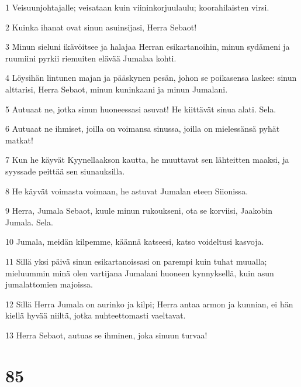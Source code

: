 \par 1 Veisuunjohtajalle; veisataan kuin viininkorjuulaulu; koorahilaisten virsi.
\par 2 Kuinka ihanat ovat sinun asuinsijasi, Herra Sebaot!
\par 3 Minun sieluni ikävöitsee ja halajaa Herran esikartanoihin, minun sydämeni ja ruumiini pyrkii riemuiten elävää Jumalaa kohti.
\par 4 Löysihän lintunen majan ja pääskynen pesän, johon se poikasensa laskee: sinun alttarisi, Herra Sebaot, minun kuninkaani ja minun Jumalani.
\par 5 Autuaat ne, jotka sinun huoneessasi asuvat! He kiittävät sinua alati. Sela.
\par 6 Autuaat ne ihmiset, joilla on voimansa sinussa, joilla on mielessänsä pyhät matkat!
\par 7 Kun he käyvät Kyynellaakson kautta, he muuttavat sen lähteitten maaksi, ja syyssade peittää sen siunauksilla.
\par 8 He käyvät voimasta voimaan, he astuvat Jumalan eteen Siionissa.
\par 9 Herra, Jumala Sebaot, kuule minun rukoukseni, ota se korviisi, Jaakobin Jumala. Sela.
\par 10 Jumala, meidän kilpemme, käännä katseesi, katso voideltusi kasvoja.
\par 11 Sillä yksi päivä sinun esikartanoissasi on parempi kuin tuhat muualla; mieluummin minä olen vartijana Jumalani huoneen kynnyksellä, kuin asun jumalattomien majoissa.
\par 12 Sillä Herra Jumala on aurinko ja kilpi; Herra antaa armon ja kunnian, ei hän kiellä hyvää niiltä, jotka nuhteettomasti vaeltavat.
\par 13 Herra Sebaot, autuas se ihminen, joka sinuun turvaa!

\chapter{85}

